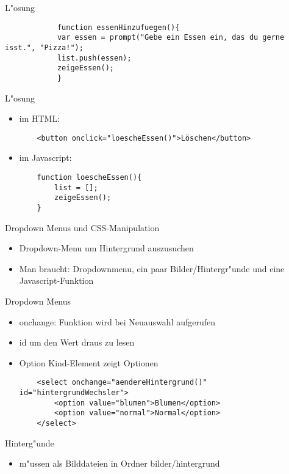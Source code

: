 \documentclass[18pt]{beamer}
\begin{document}
\begin{frame}[fragile]{L"osung}
		\begin{lstlisting}
			function essenHinzufuegen(){
			var essen = prompt("Gebe ein Essen ein, das du gerne isst.", "Pizza!");
			list.push(essen);
			zeigeEssen();
			}
		\end{lstlisting}
\end{frame}

\begin{frame}[fragile]{L"osung}
\begin{itemize}
	\item im HTML: 
	\begin{lstlisting}
	<button onclick="loescheEssen()">Löschen</button>
	\end{lstlisting}
	\item im Javascript:
	\begin{lstlisting}
	function loescheEssen(){
		list = [];
		zeigeEssen();
	}
	\end{lstlisting}
\end{itemize}
\end{frame}

\begin{frame}[fragile]{Dropdown Menus und CSS-Manipulation}
\begin{itemize}
	\item Dropdown-Menu um Hintergrund auszusuchen
	\item Man braucht: Dropdownmenu, ein paar Bilder/Hintergr"unde und eine Javascript-Funktion 
\end{itemize}
\end{frame}

\begin{frame}[fragile]{Dropdown Menus}
\begin{itemize}
	\item onchange: Funktion wird bei Neuauswahl aufgerufen
	\item id um den Wert draus zu lesen
	\item Option Kind-Element zeigt Optionen

\begin{lstlisting}
	<select onchange="aendereHintergrund()"  id="hintergrundWechsler">
		<option value="blumen">Blumen</option>
		<option value="normal">Normal</option>
	</select>
\end{lstlisting}
\end{itemize}
\end{frame}

\begin{frame}[fragile]{Hinterg"unde}
\begin{itemize}
	\item m"ussen als Bilddateien in Ordner bilder/hintergrund
	
\end{itemize}
\end{frame}
\end{document}
